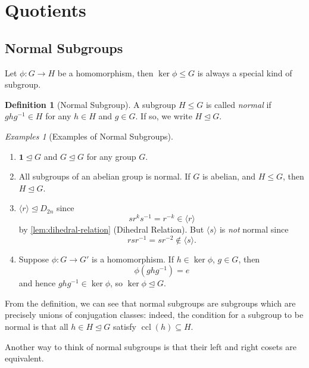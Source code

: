 \documentclass{article}
\theoremstyle{definition}
\newtheorem{definition}[theorem]{Definition}
\theoremstyle{remark}
\newcommand{\pqty}[1]{\left(#1\right)}
\newcommand{\angBrac}[1]{\langle #1\rangle}
\newcommand{\functiondomain}[3]{#1:#2\to #3}
\newcommand{\inverse}{^{-1}}
\newcommand{\normalsub}{\trianglelefteq}
\newcommand{\subgroup}{\leq}
\newcommand{\ccl}{\operatorname{ccl}}
\newtheorem*{examples*}{Examples}
\newcommand{\trivialgp}{\mathbf{1}}
\begin{document}
\section{Quotients}
\label{sec:quotients}

\subsection{Normal Subgroups}
\label{sec:normal-subgroups}

Let \(\functiondomain{\phi}{G}{H}\) be a homomorphism, then \(\ker \phi \subgroup G\) is always a special kind of subgroup.

\begin{definition}[Normal Subgroup]
    \label{def:normal-subgroup}%
    A subgroup \(H \subgroup G\) is called \emph{normal} if \(g h g\inverse \in H\) for any \(h \in H\) and \(g \in G\). If so, we write \(H \normalsub G\).
\end{definition}

\begin{examples*}[Examples of Normal Subgroups]
    \begin{enumerate}
        \item \(\trivialgp \normalsub G\) and \(G \normalsub G\) for any group \(G\).
        \item All subgroups of an abelian group is normal. If \(G\) is abelian, and \(H \subgroup G\), then \(H \normalsub G\).
        \item \(\angBrac{r} \normalsub D_{2n}\) since
        \[
            s r^k s\inverse = r^{-k} \in \angBrac{r}
        \]
        by \autoref{lem:dihedral-relation} (Dihedral Relation). But \(\angBrac{s}\) is \emph{not} normal since
        \[
            r s r \inverse = s r^{-2} \notin \angBrac{s}.
        \]
        \item Suppose \(\functiondomain{\phi}{G}{G'}\) is a homomorphism. If \(h \in \ker \phi\), \(g \in G\), then
        \[
            \phi\pqty{g h g\inverse} = e
        \]
        and hence \(g h g\inverse \in \ker \phi\), so \(\ker \phi \normalsub G\).
    \end{enumerate}
\end{examples*}

From the definition, we can see that normal subgroups are subgroups which are precisely unions of conjugation classes: indeed, the condition for a subgroup to be normal is that all \(h \in H \normalsub G\) satisfy \(\ccl\pqty{h} \subseteq H\).

Another way to think of normal subgroups is that their left and right cosets are equivalent.
\end{document}
